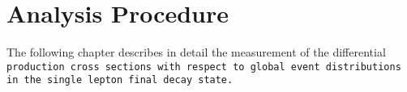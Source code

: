 \chapter{Analysis Procedure}
\label{ch:analysis}

The following chapter describes in detail the measurement of the differential \tt{} production cross sections with respect to global event distributions in the single lepton final decay state.










